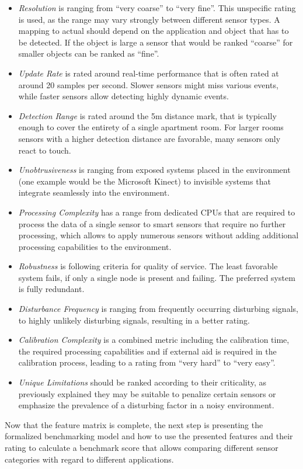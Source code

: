 \begin{itemize}
\item \emph{Resolution} is ranging from “very coarse” to “very fine”. This unspecific rating is used, as the range may vary strongly between different sensor types. A mapping to actual should depend on the application and object that has to be detected. If the object is large a sensor that would be ranked “coarse” for smaller objects can be ranked as “fine”.
\item \emph{Update Rate} is rated around real-time performance that is often rated at around 20 samples per second. Slower sensors might miss various events, while faster sensors allow detecting highly dynamic events.
\item \emph{Detection Range} is rated around the 5m distance mark, that is typically enough to cover the entirety of a single apartment room. For larger rooms sensors with a higher detection distance are favorable, many sensors only react to touch.
\item \emph{Unobtrusiveness} is ranging from exposed systems placed in the environment (one example would be the Microsoft Kinect) to invisible systems that integrate seamlessly into the environment.
\item \emph{Processing Complexity} has a range from dedicated CPUs that are required to process the data of a single sensor to smart sensors that require no further processing, which allows to apply numerous sensors without adding additional processing capabilities to the environment.
\item \emph{Robustness} is following criteria for quality of service. The least favorable system fails, if only a single node is present and failing. The preferred system is fully redundant.
\item \emph{Disturbance Frequency} is ranging from frequently occurring disturbing signals, to highly unlikely disturbing signals, resulting in a better rating.
\item \emph{Calibration Complexity} is a combined metric including the calibration time, the required processing capabilities and if external aid is required in the calibration process, leading to a rating from “very hard” to “very easy”.
\item \emph{Unique Limitations} should be ranked according to their criticality, as previously explained they may be suitable to penalize certain sensors or emphasize the prevalence of a disturbing factor in a noisy environment.
\end{itemize}
Now that the feature matrix is complete, the next step is presenting the formalized benchmarking model and how to use the presented features and their rating to calculate a benchmark score that allows comparing different sensor categories with regard to different applications.

